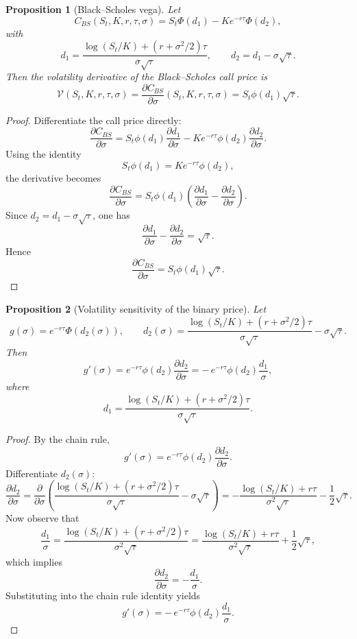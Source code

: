 \documentclass[11pt]{article}
\numberwithin{equation}{section}
\theoremstyle{plain}
\newtheorem{proposition}{Proposition}[section]
\begin{document}
\begin{proposition}[Black--Scholes vega]
\label{prop:vega-formula}
Let
\[
C_{BS}(S_t,K,r,\tau,\sigma)=S_t\Phi(d_1)-Ke^{-r\tau}\Phi(d_2),
\]
with
\[
d_1=\frac{\log(S_t/K)+(r+\sigma^2/2)\tau}{\sigma\sqrt{\tau}},
\qquad
d_2=d_1-\sigma\sqrt{\tau}.
\]
Then the volatility derivative of the Black--Scholes call price is
\[
\mathcal{V}(S_t,K,r,\tau,\sigma)
=
\frac{\partial C_{BS}}{\partial \sigma}(S_t,K,r,\tau,\sigma)
=
S_t\phi(d_1)\sqrt{\tau}.
\]
\end{proposition}

\begin{proof}
Differentiate the call price directly:
\[
\frac{\partial C_{BS}}{\partial \sigma}
=
S_t\phi(d_1)\frac{\partial d_1}{\partial \sigma}
-Ke^{-r\tau}\phi(d_2)\frac{\partial d_2}{\partial \sigma}.
\]
Using the identity
\[
S_t\phi(d_1)=Ke^{-r\tau}\phi(d_2),
\]
the derivative becomes
\[
\frac{\partial C_{BS}}{\partial \sigma}
=
S_t\phi(d_1)\left(\frac{\partial d_1}{\partial \sigma}-\frac{\partial d_2}{\partial \sigma}\right).
\]
Since $d_2=d_1-\sigma\sqrt{\tau}$, one has
\[
\frac{\partial d_1}{\partial \sigma}-\frac{\partial d_2}{\partial \sigma}=\sqrt{\tau}.
\]
Hence
\[
\frac{\partial C_{BS}}{\partial \sigma}=S_t\phi(d_1)\sqrt{\tau}.
\]
\end{proof}

\begin{proposition}[Volatility sensitivity of the binary price]
\label{prop:digital-sensitivity}
Let
\[
g(\sigma)=e^{-r\tau}\Phi(d_2(\sigma)),
\qquad
d_2(\sigma)=\frac{\log(S_t/K)+(r+\sigma^2/2)\tau}{\sigma\sqrt{\tau}}-\sigma\sqrt{\tau}.
\]
Then
\[
g'(\sigma)
=
e^{-r\tau}\phi(d_2)\frac{\partial d_2}{\partial \sigma}
=
-\,e^{-r\tau}\phi(d_2)\frac{d_1}{\sigma},
\]
where
\[
d_1=\frac{\log(S_t/K)+(r+\sigma^2/2)\tau}{\sigma\sqrt{\tau}}.
\]
\end{proposition}

\begin{proof}
By the chain rule,
\[
g'(\sigma)=e^{-r\tau}\phi(d_2)\frac{\partial d_2}{\partial \sigma}.
\]
Differentiate $d_2(\sigma)$:
\[
\frac{\partial d_2}{\partial \sigma}
=
\frac{\partial}{\partial \sigma}
\left(
\frac{\log(S_t/K)+(r+\sigma^2/2)\tau}{\sigma\sqrt{\tau}}-\sigma\sqrt{\tau}
\right)
=
-\frac{\log(S_t/K)+r\tau}{\sigma^2\sqrt{\tau}}-\frac{1}{2}\sqrt{\tau}.
\]
Now observe that
\[
\frac{d_1}{\sigma}
=
\frac{\log(S_t/K)+(r+\sigma^2/2)\tau}{\sigma^2\sqrt{\tau}}
=
\frac{\log(S_t/K)+r\tau}{\sigma^2\sqrt{\tau}}+\frac{1}{2}\sqrt{\tau},
\]
which implies
\[
\frac{\partial d_2}{\partial \sigma}=-\frac{d_1}{\sigma}.
\]
Substituting into the chain rule identity yields
\[
g'(\sigma)=-\,e^{-r\tau}\phi(d_2)\frac{d_1}{\sigma}.
\]
\end{proof}
\end{document}
